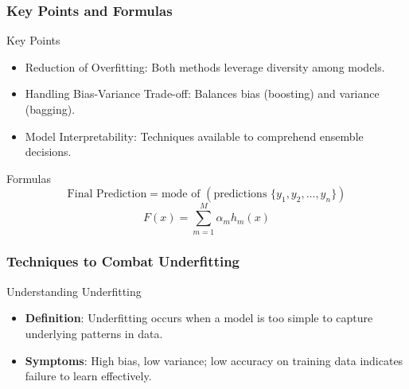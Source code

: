 \documentclass[aspectratio=169]{beamer}
\begin{document}
\begin{frame}[fragile]
    \frametitle{Key Points and Formulas}
    \begin{block}{Key Points}
        \begin{itemize}
            \item Reduction of Overfitting: Both methods leverage diversity among models.
            \item Handling Bias-Variance Trade-off: Balances bias (boosting) and variance (bagging).
            \item Model Interpretability: Techniques available to comprehend ensemble decisions.
        \end{itemize}
    \end{block}
    
    \begin{block}{Formulas}
        \begin{equation}
            \text{Final Prediction} = \text{mode of } (\text{predictions } \{y_1, y_2, \ldots, y_n\})
        \end{equation}
        \begin{equation}
            F(x) = \sum_{m=1}^{M} \alpha_m h_m(x)
        \end{equation}
    \end{block}
\end{frame}

\begin{frame}[fragile]
    \frametitle{Techniques to Combat Underfitting}
    \begin{block}{Understanding Underfitting}
        \begin{itemize}
            \item \textbf{Definition}: Underfitting occurs when a model is too simple to capture underlying patterns in data.
            \item \textbf{Symptoms}: High bias, low variance; low accuracy on training data indicates failure to learn effectively.
        \end{itemize}
    \end{block}
\end{frame}
\end{document}
